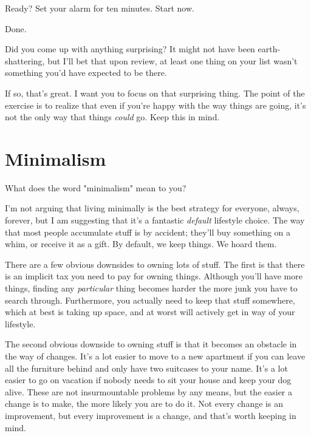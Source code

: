 \documentclass[]{book}
\begin{document}
Ready? Set your alarm for ten minutes. Start now.

Done.

Did you come up with anything surprising? It might not have been
earth-shattering, but I'll bet that upon review, at least one thing on your list
wasn't something you'd have expected to be there.

If so, that's great. I want you to focus on that surprising thing. The point of
the exercise is to realize that even if you're happy with the way things are
going, it's not the only way that things \emph{could} go. Keep this in mind.





\chapter{Minimalism}

What does the word "minimalism" mean to you?


I'm not arguing that living minimally is the best strategy for everyone, always,
forever, but I am suggesting that it's a fantastic \emph{default} lifestyle
choice. The way that most people accumulate stuff is by accident; they'll buy
something on a whim, or receive it as a gift. By default, we keep things. We
hoard them.

There are a few obvious downsides to owning lots of stuff. The first is that
there is an implicit tax you need to pay for owning things. Although you'll have
more things, finding any \emph{particular} thing becomes harder the more junk
you have to search through. Furthermore, you actually need to keep that stuff
somewhere, which at best is taking up space, and at worst will actively get in
way of your lifestyle.

The second obvious downside to owning stuff is that it becomes an obstacle in
the way of changes. It's a lot easier to move to a new apartment if you can
leave all the furniture behind and only have two suitcases to your name. It's a
lot easier to go on vacation if nobody needs to sit your house and keep your dog
alive. These are not insurmountable problems by any means, but the easier a
change is to make, the more likely you are to do it. Not every change is an
improvement, but every improvement is a change, and that's worth keeping in
mind.
\end{document}
